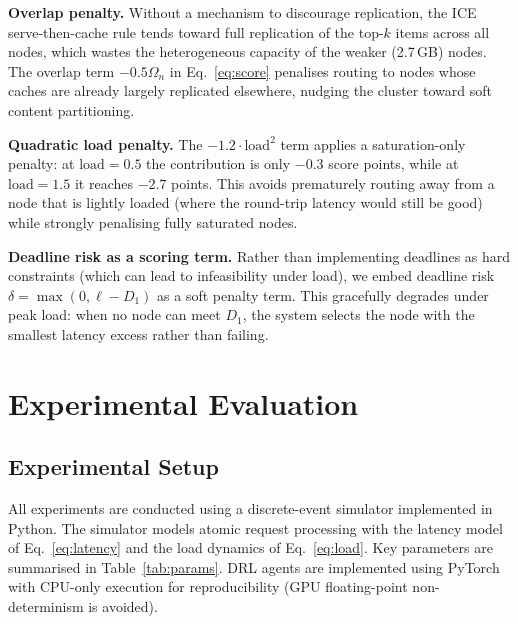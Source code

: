 \documentclass[conference]{IEEEtran}
\begin{document}
\textbf{Overlap penalty.}  Without a mechanism to discourage
replication, the ICE serve-then-cache rule tends toward full
replication of the top-$k$ items across all nodes, which wastes the
heterogeneous capacity of the weaker (2.7\,GB) nodes.  The overlap
term $-0.5 \Omega_n$ in Eq.~\ref{eq:score} penalises routing to nodes
whose caches are already largely replicated elsewhere, nudging the
cluster toward soft content partitioning.

\textbf{Quadratic load penalty.}  The $-1.2 \cdot \mathrm{load}^2$
term applies a saturation-only penalty: at $\mathrm{load} = 0.5$
the contribution is only $-0.3$ score points, while at
$\mathrm{load} = 1.5$ it reaches $-2.7$ points.  This avoids
prematurely routing away from a node that is lightly loaded (where
the round-trip latency would still be good) while strongly penalising
fully saturated nodes.

\textbf{Deadline risk as a scoring term.}  Rather than implementing
deadlines as hard constraints (which can lead to infeasibility under
load), we embed deadline risk $\delta = \max(0, \ell - D_1)$ as a
soft penalty term.  This gracefully degrades under peak load: when no
node can meet $D_1$, the system selects the node with the smallest
latency excess rather than failing.

\section{Experimental Evaluation}
\label{sec:eval}

\subsection{Experimental Setup}

All experiments are conducted using a discrete-event simulator
implemented in Python.  The simulator models atomic request processing
with the latency model of Eq.~\ref{eq:latency} and the load dynamics
of Eq.~\ref{eq:load}.  Key parameters are summarised in
Table~\ref{tab:params}.  DRL agents are implemented using PyTorch with
CPU-only execution for reproducibility (GPU floating-point
non-determinism is avoided).
\end{document}
